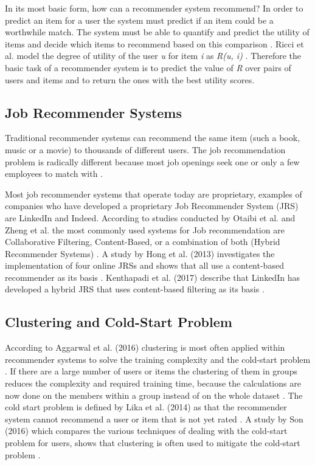 In its most basic form, how can a recommender system recommend? 
In order to predict an item for a user the system must predict if an item could be a worthwhile match. 
The system must be able to quantify and predict the utility of items and decide which items to recommend based on this comparison \cite{2015RecommenderHandbook}. 
Ricci et al. model the degree of utility of the user \textit{u} for item \textit{i} as \textit{R(u, i)} \cite{Ricci2018RecommenderTechniques}. 
Therefore the basic task of a recommender system is to predict the value of \textit{R} over pairs of users and items and to return the ones with the best utility scores.

\subsection{Job Recommender Systems}
\label{sec:jrs}
Traditional recommender systems can recommend the same item (such a book, music or a movie) to thousands of different users. 
The job recommendation problem is radically different because most job openings seek one or only a few employees to match with \cite{kenthapadi2017personalized}.

Most job recommender systems that operate today are proprietary, examples of companies who have developed a proprietary Job Recommender System (JRS) are LinkedIn and Indeed.
According to studies conducted by Otaibi et al. and Zheng et al. the most commonly used  systems for Job recommendation are Collaborative Filtering, Content-Based, or a combination of both (Hybrid Recommender Systems) \cite{T.Al-Otaibi2012ASystems} \cite{Zheng2012JobSurvey}.
A study by Hong et al. (2013) investigates the implementation of four online JRSs and shows that all use a content-based recommender as its basis \cite{hong2013job}.
Kenthapadi et al. (2017) describe that LinkedIn has developed a hybrid JRS that uses content-based filtering as its basis \cite{kenthapadi2017personalized}.

\subsection{Clustering and Cold-Start Problem}
\label{sec:ccs}
According to Aggarwal et al. (2016) clustering is most often applied within recommender systems to solve the training complexity and the cold-start problem \cite{aggarwal2016recommender}.
If there are a large number of users or items the clustering of them in groups reduces the complexity and required training time, because the calculations are now done on the members within a group instead of on the whole dataset \cite{aggarwal2016content}.
The cold start problem is defined by Lika et al. (2014) as that the recommender system cannot recommend a user or item that is not yet rated \cite{lika2014facing}.
A study by Son (2016) which compares the various techniques of dealing with the cold-start problem for users, shows that clustering is often used to mitigate the cold-start problem \cite{son2016dealing}.


